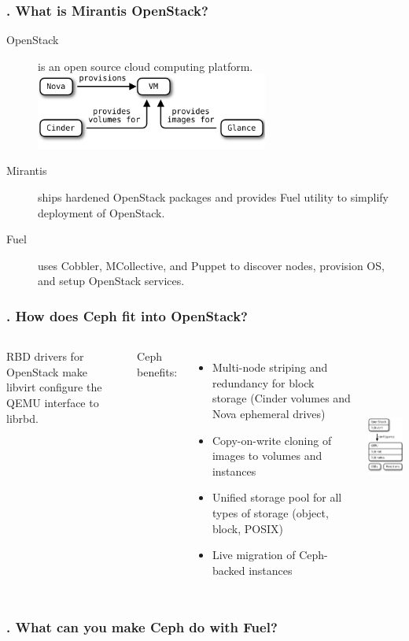 \documentclass[hyperref=unicode,utf8,xcolor=pst]{beamer}
\begin{document}
\begin{frame}
	\frametitle{\insertframenumber{}. What is Mirantis OpenStack?}

	\begin{description}
		\item[OpenStack] is an open source cloud computing
			platform.\\
			\vspace{1.5ex}
			\includegraphics[height=2.5cm]{openstack-components}
		\item[Mirantis] ships hardened OpenStack packages and
			provides Fuel utility to simplify deployment of
			OpenStack.
		\item[Fuel] uses Cobbler, MCollective, and Puppet to
			discover nodes, provision OS, and setup
			OpenStack services.
	\end{description}
\end{frame}

\begin{frame}
	\frametitle{\insertframenumber{}. How does Ceph fit into
	OpenStack?}
	\begin{columns}
		RBD drivers for OpenStack make libvirt configure the
		QEMU interface to librbd.

		\vspace{2ex}
		Ceph benefits:
		\begin{itemize}
			\item Multi-node striping and redundancy for
				block storage (Cinder volumes and Nova
				ephemeral drives)
			\item Copy-on-write cloning of images to
				volumes and instances
			\item Unified storage pool for all types of
				storage (object, block, POSIX)
			\item Live migration of Ceph-backed instances
		\end{itemize}

		\includegraphics[height=6.5cm]{ceph-rbd-openstack}
	\end{columns}
\end{frame}

\begin{frame}
	\frametitle{\insertframenumber{}. What can you make Ceph do with
	Fuel?}
\end{frame}
\end{document}

